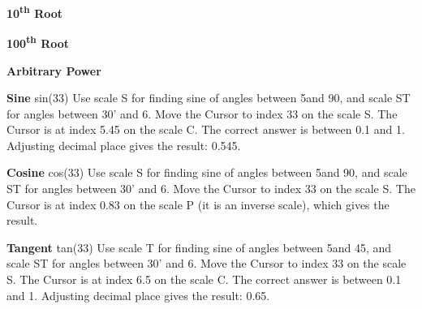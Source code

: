 \documentclass[a4paper,9pt]{article}
\begin{document}
\begin{multicols*}{3}
{  \textbf{10\textsuperscript{th} Root}

  \textbf{100\textsuperscript{th} Root}

  \textbf{Arbitrary Power}

  \textbf{Sine} sin(33\textdegree)
Use scale S for finding sine of angles between 5\textdegree and 90\textdegree, and scale ST for angles between 30' and 6\textdegree.
Move the Cursor to index 33 on the scale S.
The Cursor is at index 5.45 on the scale C.
The correct answer is between 0.1 and 1. Adjusting decimal place gives the result: 0.545.

  \textbf{Cosine} cos(33\textdegree)
Use scale S for finding sine of angles between 5\textdegree and 90\textdegree, and scale ST for angles between 30' and 6\textdegree.
Move the Cursor to index 33 on the scale S.
The Cursor is at index 0.83 on the scale P (it is an inverse scale), which gives the result.

  \textbf{Tangent} tan(33\textdegree)
Use scale T for finding sine of angles between 5\textdegree and 45\textdegree, and scale ST for angles between 30' and 6\textdegree.
Move the Cursor to index 33 on the scale S.
The Cursor is at index 6.5 on the scale C.
The correct answer is between 0.1 and 1. Adjusting decimal place gives the result: 0.65.
  }
  \end{multicols*}
  
\end{document}
